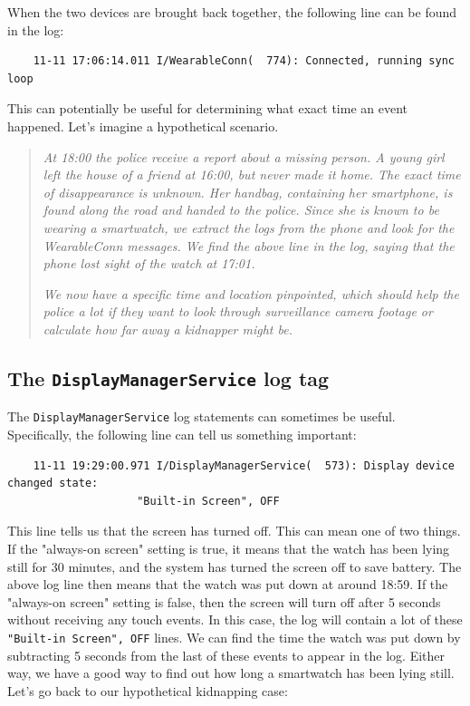 \documentclass[a4paper,11pt,dvips]{article}
\begin{document}
\noindent
When the two devices are brought back together, the following line can be found in the log:

\scriptsize
\begin{verbatim}
    11-11 17:06:14.011 I/WearableConn(  774): Connected, running sync loop
\end{verbatim}
\normalsize

\noindent
This can potentially be useful for determining what exact time an event happened. Let's imagine a hypothetical scenario.

\begin{quote}
\textit{At 18:00 the police receive a report about a missing person. A young girl left the house of a friend at 16:00, but never made it home. The exact time of disappearance is unknown. Her handbag, containing her smartphone, is found along the road and handed to the police. Since she is known to be wearing a smartwatch, we extract the logs from the phone and look for the WearableConn messages. We find the above line in the log, saying that the phone lost sight of the watch at 17:01.}

\textit{We now have a specific time and location pinpointed, which should help the police a lot if they want to look through surveillance camera footage or calculate how far away a kidnapper might be.}
\end{quote}


\subsection{The \texttt{DisplayManagerService} log tag}

The \texttt{DisplayManagerService} log statements can sometimes be useful. Specifically, the following line can tell us something important:

\scriptsize
\begin{verbatim}
    11-11 19:29:00.971 I/DisplayManagerService(  573): Display device changed state:
                    "Built-in Screen", OFF
\end{verbatim}
\normalsize

\noindent
This line tells us that the screen has turned off. This can mean one of two things. If the "always-on screen" setting is true, it means that the watch has been lying still for 30 minutes, and the system has turned the screen off to save battery. The above log line then means that the watch was put down at around 18:59. If the "always-on screen" setting is false, then the screen will turn off after 5 seconds without receiving any touch events. In this case, the log will contain a lot of these \texttt{"Built-in Screen", OFF} lines. We can find the time the watch was put down by subtracting 5 seconds from the last of these events to appear in the log. Either way, we have a good way to find out how long a smartwatch has been lying still. Let's go back to our hypothetical kidnapping case:
\end{document}
